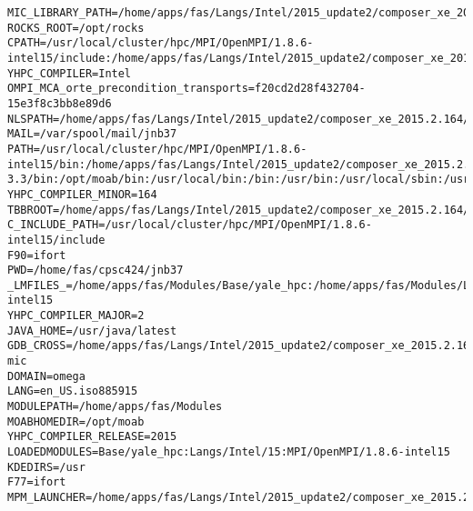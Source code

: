 \documentclass[11pt]{article}
\begin{document}
\begin{verbatim}
MIC_LIBRARY_PATH=/home/apps/fas/Langs/Intel/2015_update2/composer_xe_2015.2.164/compiler/lib/mic:/home/apps/fas/Langs/Intel/2015_update2/composer_xe_2015.2.164/mpirt/lib/mic:/home/apps/fas/Langs/Intel/2015_update2/composer_xe_2015.2.164/tbb/lib/mic
ROCKS_ROOT=/opt/rocks
CPATH=/usr/local/cluster/hpc/MPI/OpenMPI/1.8.6-intel15/include:/home/apps/fas/Langs/Intel/2015_update2/composer_xe_2015.2.164/ipp/include:/home/apps/fas/Langs/Intel/2015_update2/composer_xe_2015.2.164/mkl/include:/home/apps/fas/Langs/Intel/2015_update2/composer_xe_2015.2.164/tbb/include
YHPC_COMPILER=Intel
OMPI_MCA_orte_precondition_transports=f20cd2d28f432704-15e3f8c3bb8e89d6
NLSPATH=/home/apps/fas/Langs/Intel/2015_update2/composer_xe_2015.2.164/compiler/lib/intel64/locale/%l_%t/%N:/home/apps/fas/Langs/Intel/2015_update2/composer_xe_2015.2.164/ipp/lib/intel64/locale/%l_%t/%N:/home/apps/fas/Langs/Intel/2015_update2/composer_xe_2015.2.164/mkl/lib/intel64/locale/%l_%t/%N:/home/apps/fas/Langs/Intel/2015_update2/composer_xe_2015.2.164/debugger/gdb/intel64_mic/share/locale/%l_%t/%N:/home/apps/fas/Langs/Intel/2015_update2/composer_xe_2015.2.164/debugger/gdb/intel64/share/locale/%l_%t/%N
MAIL=/var/spool/mail/jnb37
PATH=/usr/local/cluster/hpc/MPI/OpenMPI/1.8.6-intel15/bin:/home/apps/fas/Langs/Intel/2015_update2/composer_xe_2015.2.164/bin/intel64:/home/apps/fas/Langs/Intel/2015_update2/composer_xe_2015.2.164/mpirt/bin/intel64:/home/apps/fas/Langs/Intel/2015_update2/composer_xe_2015.2.164/debugger/gdb/intel64_mic/bin:/home/apps/fas/Langs/Intel/2015_update2/composer_xe_2015.2.164/debugger/gdb/intel64/bin:/home/apps/fas/Modules:/usr/lib64/qt-3.3/bin:/opt/moab/bin:/usr/local/bin:/bin:/usr/bin:/usr/local/sbin:/usr/sbin:/sbin:/usr/java/latest/bin:/opt/rocks/bin:/opt/rocks/sbin:/home/apps/bin:/home/fas/cpsc424/jnb37/bin
YHPC_COMPILER_MINOR=164
TBBROOT=/home/apps/fas/Langs/Intel/2015_update2/composer_xe_2015.2.164/tbb
C_INCLUDE_PATH=/usr/local/cluster/hpc/MPI/OpenMPI/1.8.6-intel15/include
F90=ifort
PWD=/home/fas/cpsc424/jnb37
_LMFILES_=/home/apps/fas/Modules/Base/yale_hpc:/home/apps/fas/Modules/Langs/Intel/15:/home/apps/fas/Modules/MPI/OpenMPI/1.8.6-intel15
YHPC_COMPILER_MAJOR=2
JAVA_HOME=/usr/java/latest
GDB_CROSS=/home/apps/fas/Langs/Intel/2015_update2/composer_xe_2015.2.164/debugger/gdb/intel64_mic/bin/gdb-mic
DOMAIN=omega
LANG=en_US.iso885915
MODULEPATH=/home/apps/fas/Modules
MOABHOMEDIR=/opt/moab
YHPC_COMPILER_RELEASE=2015
LOADEDMODULES=Base/yale_hpc:Langs/Intel/15:MPI/OpenMPI/1.8.6-intel15
KDEDIRS=/usr
F77=ifort
MPM_LAUNCHER=/home/apps/fas/Langs/Intel/2015_update2/composer_xe_2015.2.164/debugger/mpm/bin/start_mpm.sh

\end{verbatim}
\end{document}
